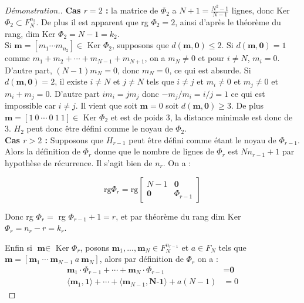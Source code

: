 \documentclass[10pt]{article}
\begin{document}
\begin{proof}[Démonstration.]
\textbf{Cas $r=2$ :}
la matrice de $\Phi_2$ a $N+1=\frac{N^2-1}{N-1}$ lignes, donc Ker $\Phi_2 \subset F_N^{n_2}$. De plus il est apparent que rg $\Phi_2 = 2$, ainsi  d'après le théorème du rang, dim Ker $\Phi_2=N-1=k_2$.
\\
Si $\textbf{m}=[m_1 \cdots m_{n_2}] \in $ Ker $\Phi_2$, supposons que $d(\textbf{m},\textbf{0}) \leq 2$. Si $d(\textbf{m},\textbf{0})=1$ comme $m_1 + m_2 + \cdots + m_{N-1} + m_{N+1}$, on a $m_N \neq 0$ et pour $i \neq N$, $m_i = 0$. D'autre part, $(N-1)m_N=0$, donc $m_N=0$, ce qui est absurde.
Si $d(\textbf{m},\textbf{0})=2$, il existe $i \neq N$ et $j \neq N$ tels que $i \neq j$ et $m_i \neq 0$ et $m_j \neq 0$ et $m_i+m_j=0$. D'autre part $ i m_i = j m_j$ donc $-m_j/m_i = i/j = 1$ ce qui est impossible car $i \neq j$. Il vient que soit $\textbf{m}=0$ soit $d(\textbf{m},\textbf{0}) \geq 3$. De plus $\textbf{m}=[1 \ 0 \ \cdots \ 0 \ 1 \ 1] \in $ Ker $\Phi_2$ et est de poids 3, la distance minimale est donc de 3. $H_2$ peut donc être défini comme le noyau de $\Phi_2$.
\\

\textbf{Cas $r>2$ :} 
Supposons que $H_{r-1}$ peut être défini comme étant le noyau de $\Phi_{r-1}$. Alors la définition de $\Phi_r$ donne que le nombre de lignes de $\Phi_r$ est $N n_{r-1} + 1$ par hypothèse de récurrence. Il s'agit bien de $n_r$. On a :

$$ \text{rg} \Phi_r = \text{rg} \begin{bmatrix}
N-1 & \textbf{0} \\
\textbf{0} & \Phi_{r-1}
\end{bmatrix}
$$

Donc rg $\Phi_r = $ rg $\Phi_{r-1} +1 = r$, et par théorème du rang dim Ker $\Phi_r = n_r -r=k_r$.


Enfin si $\textbf{m} \in $ Ker $\Phi_r$, posons $\textbf{m}_1, ..., \textbf{m}_N \in F_N^{n_{r-1}}$ et $a \in F_N$ tels que $\textbf{m}=[\textbf{m}_1 \ \cdots \ \textbf{m}_{N-1} \ a \ \textbf{m}_N]$, alors par définition de $\Phi_r$ on a : 
\begin{align}
\textbf{m}_1 \cdot \Phi_{r-1} + \cdots + \textbf{m}_{N} \cdot \Phi_{r-1} &= \textbf{0} \\
\langle \textbf{m}_1 , \textbf{1} \rangle + \cdots +  \langle \textbf{m}_{N-1}, \textbf{N-1} \rangle + a(N-1) &= 0
\end{align}


\end{proof}
\end{document}
